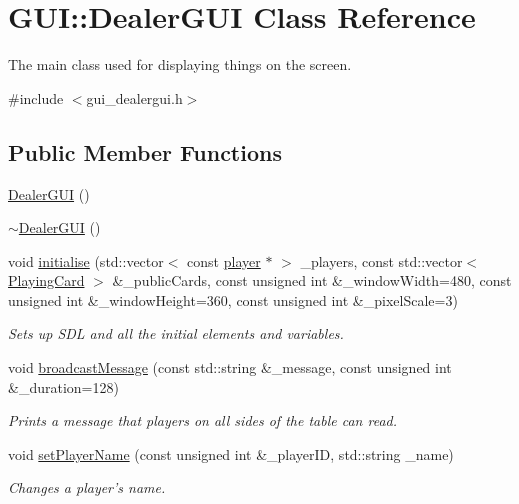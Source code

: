 \hypertarget{classGUI_1_1DealerGUI}{\section{G\-U\-I\-:\-:Dealer\-G\-U\-I Class Reference}
\label{classGUI_1_1DealerGUI}
}


The main class used for displaying things on the screen.  




{\ttfamily \#include $<$gui\-\_\-dealergui.\-h$>$}

\subsection*{Public Member Functions}
\begin{DoxyCompactItemize}
\item 
\hyperlink{classGUI_1_1DealerGUI_a5e83f89d34df58fb80d51806c8883b1b}{Dealer\-G\-U\-I} ()
\item 
\hyperlink{classGUI_1_1DealerGUI_a7067ad844fe0da6df34222765f2cc2c8}{$\sim$\-Dealer\-G\-U\-I} ()
\item 
void \hyperlink{classGUI_1_1DealerGUI_a2d812c087cc3afb24d8f5d33c4254a08}{initialise} (std\-::vector$<$ const \hyperlink{classplayer}{player} $\ast$ $>$ \-\_\-players, const std\-::vector$<$ \hyperlink{classPlayingCard}{Playing\-Card} $>$ \&\-\_\-public\-Cards, const unsigned int \&\-\_\-window\-Width=480, const unsigned int \&\-\_\-window\-Height=360, const unsigned int \&\-\_\-pixel\-Scale=3)
\begin{DoxyCompactList}\small\item\em Sets up S\-D\-L and all the initial elements and variables. \end{DoxyCompactList}\item 
void \hyperlink{classGUI_1_1DealerGUI_a7295dc1791bce73e67d63fb52bb1b6c1}{broadcast\-Message} (const std\-::string \&\-\_\-message, const unsigned int \&\-\_\-duration=128)
\begin{DoxyCompactList}\small\item\em Prints a message that players on all sides of the table can read. \end{DoxyCompactList}\item 
void \hyperlink{classGUI_1_1DealerGUI_addb09544abba00f35a7a966c53e45320}{set\-Player\-Name} (const unsigned int \&\-\_\-player\-I\-D, std\-::string \-\_\-name)
\begin{DoxyCompactList}\small\item\em Changes a player's name. \end{DoxyCompactList}\item 

\end{DoxyCompactItemize}
